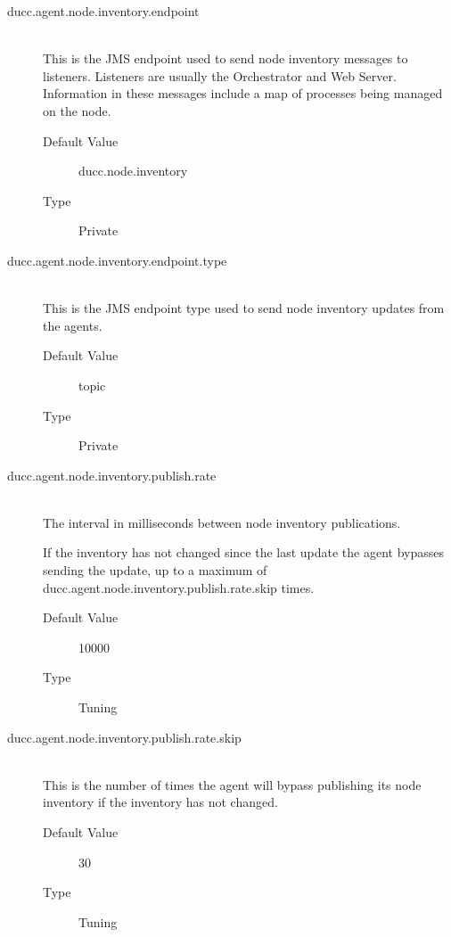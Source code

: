 \begin{description}
        \item[ducc.agent.node.inventory.endpoint] \hfill \\
          This is the JMS endpoint used to send node inventory messages to listeners. Listeners are 
          usually the Orchestrator and Web Server. Information in these messages include a map of 
          processes being managed on the node. 
          \begin{description}
            \item[Default Value] ducc.node.inventory 
            \item[Type] Private 
          \end{description}
          
        \item[ducc.agent.node.inventory.endpoint.type] \hfill \\
          This is the JMS endpoint type used to send node inventory updates from the agents. 
          \begin{description}
            \item[Default Value] topic 
            \item[Type] Private 
          \end{description}
          
        \item[ducc.agent.node.inventory.publish.rate] \hfill \\
          The interval in milliseconds between node inventory publications.

          If the inventory has not changed since the last update the agent bypasses sending the 
          update, up to a maximum of ducc.agent.node.inventory.publish.rate.skip times. 
          \begin{description}
            \item[Default Value] 10000 
            \item[Type] Tuning 
          \end{description}
          
        \item[ducc.agent.node.inventory.publish.rate.skip] \hfill \\
          This is the number of times the agent will bypass publishing its node inventory if the 
          inventory has not changed. 
          \begin{description}
            \item[Default Value] 30 
            \item[Type] Tuning 
          \end{description}
          

\end{description}
